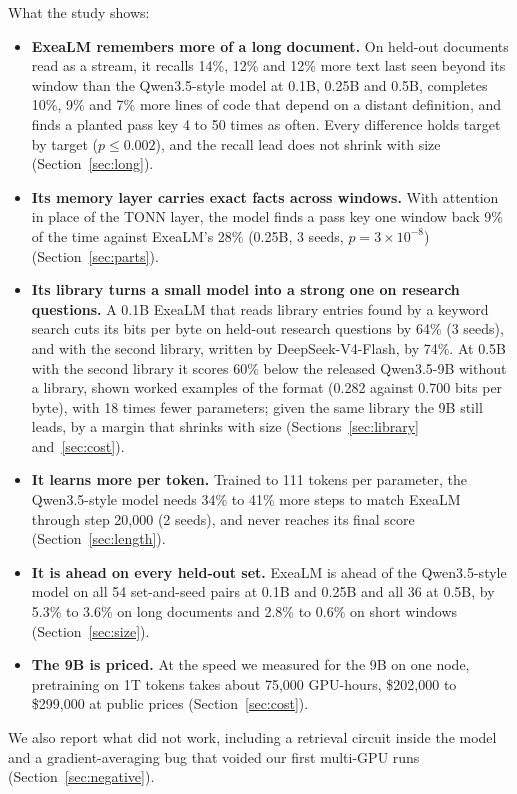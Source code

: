 \documentclass[10pt,twocolumn,letterpaper]{article}
\begin{document}
What the study shows:
\begin{itemize}
\item \textbf{ExeaLM remembers more of a long document.} On held-out documents read as a stream, it recalls 14\%, 12\% and 12\% more text last seen beyond its window than the Qwen3.5-style model at 0.1B, 0.25B and 0.5B, completes 10\%, 9\% and 7\% more lines of code that depend on a distant definition, and finds a planted pass key 4 to 50 times as often. Every difference holds target by target ($p \le 0.002$), and the recall lead does not shrink with size (Section~\ref{sec:long}).
\item \textbf{Its memory layer carries exact facts across windows.} With attention in place of the TONN layer, the model finds a pass key one window back 9\% of the time against ExeaLM's 28\% (0.25B, 3 seeds, $p = 3\times10^{-8}$) (Section~\ref{sec:parts}).
\item \textbf{Its library turns a small model into a strong one on research questions.} A 0.1B ExeaLM that reads library entries found by a keyword search cuts its bits per byte on held-out research questions by 64\% (3 seeds), and with the second library, written by DeepSeek-V4-Flash, by 74\%. At 0.5B with the second library it scores 60\% below the released Qwen3.5-9B without a library, shown worked examples of the format (0.282 against 0.700 bits per byte), with 18 times fewer parameters; given the same library the 9B still leads, by a margin that shrinks with size (Sections~\ref{sec:library} and~\ref{sec:cost}).
\item \textbf{It learns more per token.} Trained to 111 tokens per parameter, the Qwen3.5-style model needs 34\% to 41\% more steps to match ExeaLM through step 20,000 (2 seeds), and never reaches its final score (Section~\ref{sec:length}).
\item \textbf{It is ahead on every held-out set.} ExeaLM is ahead of the Qwen3.5-style model on all 54 set-and-seed pairs at 0.1B and 0.25B and all 36 at 0.5B, by 5.3\% to 3.6\% on long documents and 2.8\% to 0.6\% on short windows (Section~\ref{sec:size}).
\item \textbf{The 9B is priced.} At the speed we measured for the 9B on one node, pretraining on 1T tokens takes about 75,000 GPU-hours, \$202,000 to \$299,000 at public prices (Section~\ref{sec:cost}).
\end{itemize}
We also report what did not work, including a retrieval circuit inside the model and a gradient-averaging bug that voided our first multi-GPU runs (Section~\ref{sec:negative}).
\end{document}
